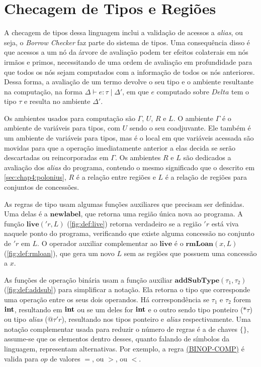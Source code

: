 \section{Checagem de Tipos e Regiões}

A checagem de tipos dessa linguagem inclui a validação de acessos a \emph{alias}, ou seja, o \emph{Borrow Checker} faz parte do sistema de tipos. Uma consequência disso é que acessos a um nó da árvore de avaliação podem ter efeitos colaterais em nós irmãos e primos, necessitando de uma ordem de avaliação em profundidade para que todos os nós sejam computados com a informação de todos os nós anteriores. Dessa forma, a avaliação de um termo devolve o seu tipo e o ambiente resultante na computação, na forma $\Delta \vdash e : \tau\;|\;\Delta'$, em que $e$ computado sobre $Delta$ tem o tipo $\tau$ e resulta no ambiente $\Delta'$.

Os ambientes usados para computação são $\Gamma$, $U$, $R$ e $L$. O ambiente $\Gamma$ é o ambiente de variáveis para tipos, com $U$ sendo o seu coadjuvante. Ele também é um ambiente de variáveis para tipos, mas é o local em que variáveis acessada são movidas para que a operação imediatamente anterior a elas decida se serão descartadas ou reincorporadas em $\Gamma$. Os ambientes $R$ e $L$ são dedicados a avaliação dos \emph{alias} do programa, contendo o mesmo significado que o descrito em \ref{sec:chap4:polonius}, $R$ é a relação entre regiões e $L$ é a relação de regiões para conjuntos de concessões. 

As regras de tipo usam algumas funções auxiliares que precisam ser definidas. Uma delas é a $\mathbf{newlabel}$, que retorna uma região única nova ao programa. A função $\mathbf{live}('r, L)$ (\ref{fig:def:live}) retorna verdadeiro se a região $'r$ está viva naquele ponto do programa, verificando que existe alguma concessão no conjunto de $'r$ em $L$. O operador auxiliar complementar ao $\mathbf{live}$ é o $\mathbf{rmLoan}(x, L)$ (\ref{fig:def:rmloan}), que gera um novo $L$ sem as regiões que possuem uma concessão a $x$.

As funções de operação binária usam a função auxiliar $\mathbf{addSubType}(\tau_1, \tau_2)$ (\ref{fig:def:addsub}) para simplificar a notação. Ela retorna o tipo que corresponde uma operação entre os seus dois operandos. Há correspondência se $\tau_1$ e $\tau_2$ forem $\mathbf{int}$, resultando em $\mathbf{int}$ ou se um deles for $\mathbf{int}$ e o outro sendo tipo ponteiro ($\text{*}\!\tau$) ou tipo \emph{alias} ($@\tau'r$), resultando nos tipos ponteiro e \emph{alias} respectivamente. Uma notação complementar usada para reduzir o número de regras é a de chaves $\{\}$, assume-se que os elementos dentro desses, quanto falando de símbolos da linguagem, representam alternativas. Por exemplo, a regra \hyperref[trule:binop-comp]{(BINOP-COMP)} é valida para $op$ de valores $=$, ou $>$, ou $<$.

